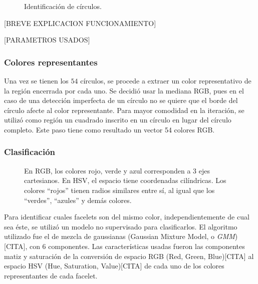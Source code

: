 \begin{figure}[h!]
	\centering
	\caption{Identificación de círculos.}
	\label{circulos}
\end{figure}

[BREVE EXPLICACION FUNCIONAMIENTO]

[PARAMETROS USADOS]

\subsubsection{Colores representantes}
Una vez se tienen los $54$ círculos, se procede a extraer un color representativo de la región encerrada por cada uno. Se decidió usar la mediana RGB, pues en el caso de una detección imperfecta de un círculo no se quiere que el borde del círculo afecte al color representante. Para mayor comodidad en la iteración, se utilizó como región un cuadrado inscrito en un círculo en lugar del círculo completo. Este paso tiene como resultado un vector 54 colores RGB.

\subsubsection{Clasificación}
\begin{figure}[h!]
	\centering
	\hfill
	\caption[Espacios de colores.]{En RGB, los colores rojo, verde y azul corresponden a 3 ejes cartesianos. En HSV, el espacio tiene coordenadas cilíndricas. Los colores ``rojos'' tienen radios similares entre sí, al igual que los ``verdes'', ``azules'' y demás colores.}
	\label{colorspace}
\end{figure}
Para identificar cuales facelets son del mismo color, independientemente de cual sea éste, se utilizó un modelo no supervisado para clasificarlos. El algoritmo utilizado fue el de mezcla de gaussianas (Gaussian Mixture Model, o \textit{GMM})[CITA], con 6 componentes. Las características usadas fueron las componentes matiz y saturación de la conversión de espacio RGB (Red, Green, Blue)[CITA] al espacio HSV (Hue, Saturation, Value)[CITA] de cada uno de los colores representantes de cada facelet.

